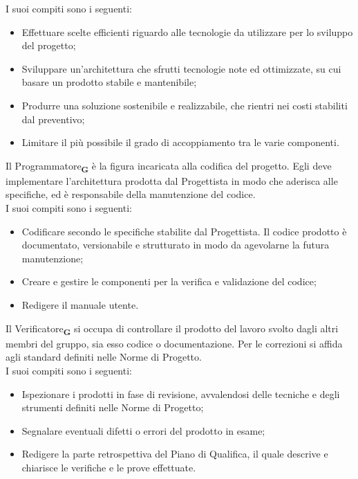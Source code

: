 I suoi compiti sono i seguenti:
\begin {itemize}
    \item Effettuare scelte efficienti riguardo alle tecnologie da utilizzare per lo sviluppo del progetto;
    \item Sviluppare un'architettura che sfrutti tecnologie note ed ottimizzate, su cui basare un prodotto stabile e mantenibile;
    \item Produrre una soluzione sostenibile e realizzabile, che rientri nei costi stabiliti dal preventivo;
    \item Limitare il più possibile il grado di accoppiamento tra le varie componenti.
\end {itemize}
Il Programmatore\textsubscript{\textbf{G}} è la figura incaricata alla codifica del progetto. Egli deve implementare l’architettura prodotta dal Progettista in modo che aderisca alle specifiche, ed è responsabile della manutenzione del codice.\\
I suoi compiti sono i seguenti:
\begin {itemize}
    \item Codificare secondo le specifiche stabilite dal Progettista. Il codice prodotto è documentato, versionabile e strutturato in modo da agevolarne la futura manutenzione;
    \item Creare e gestire le componenti per la verifica e validazione del codice;
    \item Redigere il manuale utente.
\end {itemize}
Il Verificatore\textsubscript{\textbf{G}} si occupa di controllare il prodotto del lavoro svolto dagli altri membri del gruppo, sia esso codice o documentazione. Per le correzioni si affida agli standard definiti nelle Norme di Progetto.\\
I suoi compiti sono i seguenti:
\begin {itemize}
    \item Ispezionare i prodotti in fase di revisione, avvalendosi delle tecniche e degli strumenti definiti nelle Norme di Progetto;
    \item Segnalare eventuali difetti o errori del prodotto in esame;
    \item Redigere la parte retrospettiva del Piano di Qualifica, il quale descrive e chiarisce le verifiche e le prove effettuate.
\end {itemize}
